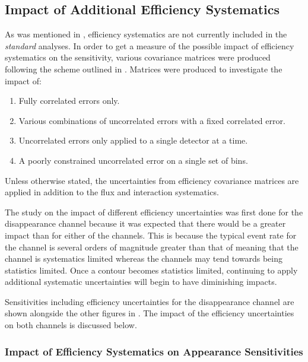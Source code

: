 \subsection{Impact of Additional Efficiency Systematics}\label{Impact of Additional Efficiency Systematics}

As was mentioned in , efficiency systematics are not currently included in the \textit{standard} analyses. In order to get a measure of the possible impact of efficiency systematics on the sensitivity, various covariance matrices were produced following the scheme outlined in . Matrices were produced to investigate the impact of:
\begin{enumerate}
    \item Fully correlated errors only.
    \item Various combinations of uncorrelated errors with a fixed correlated error.
    \item Uncorrelated errors only applied to a single detector at a time.
    \item A poorly constrained uncorrelated error on a single set of bins.
\end{enumerate}
Unless otherwise stated, the uncertainties from efficiency covariance matrices are applied in addition to the flux and interaction systematics. 

The study on the impact of different efficiency uncertainties was first done for the \numu disappearance channel because it was expected that there would be a greater impact than for either of the \nue channels. This is because the typical event rate for the \numu channel is several orders of magnitude greater than that of \nue meaning that the \numu channel is systematics limited whereas the \nue channels may tend towards being statistics limited. Once a contour becomes statistics limited, continuing to apply additional systematic uncertainties will begin to have diminishing impacts. 

Sensitivities including efficiency uncertainties for the \numu disappearance channel are shown alongside the other figures in . The impact of the efficiency uncertainties on both \nue channels is discussed below.


\subsubsection*{\texorpdfstring{Impact of Efficiency Systematics on \nue Appearance Sensitivities}{Impact of Efficiency Systematics on nue Appearance Sensitivities}}

